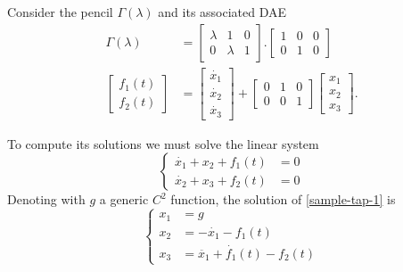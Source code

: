 \begin{example}
    Consider the pencil \(\Gamma(\lambda)\) and its associated DAE
    \begin{align*}
        \Gamma(\lambda) &=
        \begin{bmatrix}
            \lambda & 1 & 0 \\
            0 & \lambda & 1
        \end{bmatrix}.
        \begin{bmatrix}
            1 & 0 & 0 \\
            0 & 1 & 0
        \end{bmatrix} \\
        \begin{bmatrix}
            f_{1}(t) \\
            f_{2}(t)
        \end{bmatrix} &=
        \begin{bmatrix}
            \dot{x_{1}} \\
            \dot{x_{2}} \\
            \dot{x_{3}}
        \end{bmatrix}
        + \begin{bmatrix}
            0 & 1 & 0 \\
            0 & 0 & 1
        \end{bmatrix}
        \begin{bmatrix}
            x_{1} \\
            x_{2} \\
            x_{3}
        \end{bmatrix}.
    \end{align*}

    To compute its solutions we must solve the linear system
    \begin{equation} \label{sample-tap-1}
        \left\{
        \begin{aligned}
            \dot{x_{1}} + x_{2} + f_{1}(t) & = 0 \\
            \dot{x_{2}} + x_{3} + f_{2}(t) & = 0
        \end{aligned}
        \right.
    \end{equation}
    Denoting with \(g\) a generic \(C^2\) function, the solution of \eqref{sample-tap-1} is
    \begin{equation*}
        \left\{
            \begin{aligned}
                x_{1} &= g \\
                x_{2} &= -\dot{x_{1}} -f_{1}(t) \\
                x_{3} &= \ddot{x_{1}} + \dot{f_{1}}(t) - f_{2}(t)
            \end{aligned}
        \right.
    \end{equation*}
\end{example}